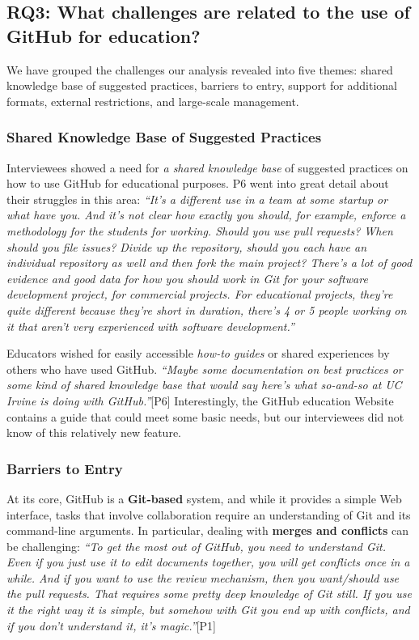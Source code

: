 \subsection{RQ3: What challenges are related to the use of GitHub for education?}
We have grouped the challenges our analysis revealed into five themes: shared knowledge base of suggested practices, barriers to entry, support for additional formats, external restrictions, and large-scale management.

\subsubsection{Shared Knowledge Base of Suggested Practices}
Interviewees showed a need for \textit{a shared knowledge base} of suggested practices on how to use GitHub for educational purposes. P6 went into great detail about their struggles in this area: \textit{``It's a different use in a team at some startup or what have you. And it's not clear how exactly you should, for example, enforce a methodology for the students for working. Should you use pull requests? When should you file issues? Divide up the repository, should you each have an individual repository as well and then fork the main project? There's a lot of good evidence and good data for how you should work in Git for your software development project, for commercial projects. For educational projects, they're quite different because they're short in duration, there's 4 or 5 people working on it that aren't very experienced with software development.''}

Educators wished for easily accessible \textit{how-to guides} or shared experiences by others who have used GitHub. \textit{``Maybe some documentation on best practices or some kind of shared knowledge base that would say here's what so-and-so at UC Irvine is doing with GitHub.''}[P6]
Interestingly, the GitHub education Website contains a guide that could meet some basic needs, but our interviewees did not know of this relatively new feature.


\subsubsection{Barriers to Entry}
At its core, GitHub is a \textbf{Git-based} system, and while it provides a simple Web interface, tasks that involve collaboration require an understanding of Git and its command-line arguments. In particular, dealing with \textbf{merges and conflicts} can be challenging: \textit{``To get the most out of GitHub, you need to understand Git. Even if you just use it to edit documents together, you will get conflicts once in a while. And if you want to use the review mechanism, then you want/should use the pull requests. That requires some pretty deep knowledge of Git still. If you use it the right way it is simple, but somehow with Git you end up with conflicts, and if you don't understand it, it's magic.''}[P1]

